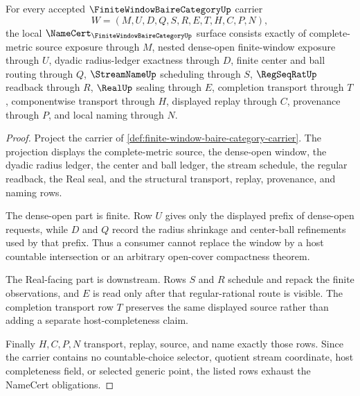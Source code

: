 
\begin{theorem}
\label{thm:finite-window-baire-category-namecert-obligations}
For every accepted $\FiniteWindowBaireCategoryUp$ carrier
$$
W=(M,U,D,Q,S,R,E,T,H,C,P,N),
$$
the local $\NameCert_{\FiniteWindowBaireCategoryUp}$ surface consists exactly of complete-metric source exposure through $M$, nested dense-open finite-window exposure through $U$, dyadic radius-ledger exactness through $D$, finite center and ball routing through $Q$, $\StreamNameUp$ scheduling through $S$, $\RegSeqRatUp$ readback through $R$, $\RealUp$ sealing through $E$, completion transport through $T$, componentwise transport through $H$, displayed replay through $C$, provenance through $P$, and local naming through $N$.
\end{theorem}
\begin{proof}
Project the carrier of \autoref{def:finite-window-baire-category-carrier}. The projection displays the complete-metric source, the dense-open window, the dyadic radius ledger, the center and ball ledger, the stream schedule, the regular readback, the Real seal, and the structural transport, replay, provenance, and naming rows.

The dense-open part is finite. Row $U$ gives only the displayed prefix of dense-open requests, while $D$ and $Q$ record the radius shrinkage and center-ball refinements used by that prefix. Thus a consumer cannot replace the window by a host countable intersection or an arbitrary open-cover compactness theorem.

The Real-facing part is downstream. Rows $S$ and $R$ schedule and repack the finite observations, and $E$ is read only after that regular-rational route is visible. The completion transport row $T$ preserves the same displayed source rather than adding a separate host-completeness claim.

Finally $H,C,P,N$ transport, replay, source, and name exactly those rows. Since the carrier contains no countable-choice selector, quotient stream coordinate, host completeness field, or selected generic point, the listed rows exhaust the NameCert obligations.
\end{proof}

